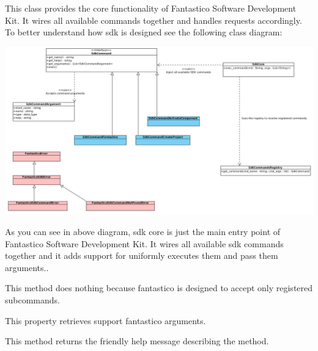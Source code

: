 \documentclass[letterpaper,10pt,english]{sphinxmanual}
\begin{document}
\begin{fulllineitems}
\label{features/sdk:fantastico.sdk.fantastico.SdkCore}
This class provides the core functionality of Fantastico Software Development Kit. It
wires all available commands together and handles requests accordingly.
To better understand how sdk is designed see the following class diagram:

\includegraphics{design.png}

As you can see in above diagram, sdk core is just the main entry point of Fantastico Software Development Kit. It wires
all available sdk commands together and it adds support for uniformly executes them and pass them arguments..

\begin{fulllineitems}
\label{features/sdk:fantastico.sdk.fantastico.SdkCore.exec}
This method does nothing because fantastico is designed to accept only registered subcommands.

\end{fulllineitems}


\begin{fulllineitems}
\label{features/sdk:fantastico.sdk.fantastico.SdkCore.get_arguments}
This property retrieves support fantastico arguments.

\end{fulllineitems}


\begin{fulllineitems}
\label{features/sdk:fantastico.sdk.fantastico.SdkCore.get_help}
This method returns the friendly help message describing the method.

\end{fulllineitems}


\end{fulllineitems}
\end{document}
